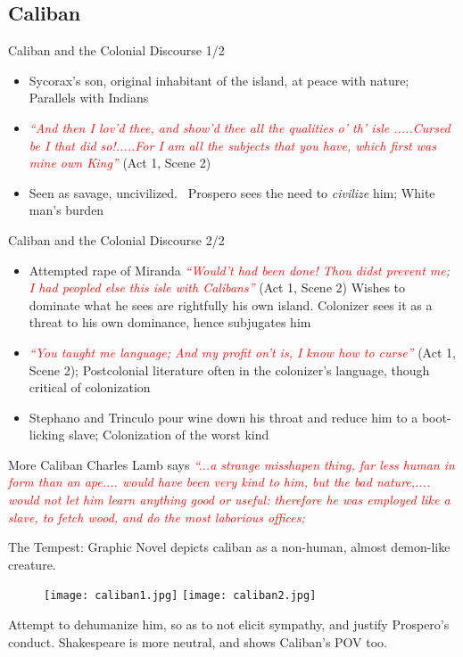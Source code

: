 \documentclass{beamer}
\begin{document}
\subsection{Caliban}
  \begin{frame}{Caliban and the Colonial Discourse 1/2}
    \begin{itemize}
    \item Sycorax's son, original inhabitant of the island, at peace with nature; Parallels with Indians
    \item \textcolor{red}{\emph{``And then I lov'd thee, and show'd thee all the qualities o' th' isle .....Cursed be I that did so!.....For I am all the subjects that you have, which first was mine own King''}} (Act 1, Scene 2)
    \item Seen as savage, uncivilized.~\cite{1989} Prospero sees the need to \emph{civilize} him; White man's burden
    \end{itemize}
  \end{frame}
  \begin{frame}{Caliban and the Colonial Discourse 2/2}
    \begin{itemize}
    \item Attempted rape of Miranda \textcolor{red}{\emph{``Would't had been done! Thou didst prevent me; I had peopled else this isle with Calibans''}} (Act 1, Scene 2) Wishes to dominate what he sees are rightfully his own island. Colonizer sees it as a threat to his own dominance, hence subjugates him
    \item \textcolor{red}{\emph{``You taught me language; And my profit on't is, I know how to curse''}} (Act 1, Scene 2); Postcolonial literature often in the colonizer's language, though critical of colonization
    \item Stephano and Trinculo pour wine down his throat and reduce him to a boot-licking slave; Colonization of the worst kind
    \end{itemize}
  \end{frame}

  \begin{frame}{More Caliban}
      Charles Lamb says \textcolor{red}{\emph{``...a strange misshapen thing, far less human in form than an ape.... would have been very kind to him, but the bad nature,.... would not let him learn anything good or useful: therefore he was employed like a slave, to fetch wood, and do the most laborious offices;}}

        The Tempest: Graphic Novel depicts caliban as a non-human, almost demon-like creature. 

        \begin{figure}[htp]
          \begin{center}
            \centering
            \texttt{[image: caliban1.jpg]}
            \texttt{[image: caliban2.jpg]}
          \end{center}
        \end{figure}

        Attempt to dehumanize him, so as to not elicit sympathy, and justify Prospero's conduct. Shakespeare is more neutral, and shows Caliban's POV too.
  \end{frame}
\end{document}
